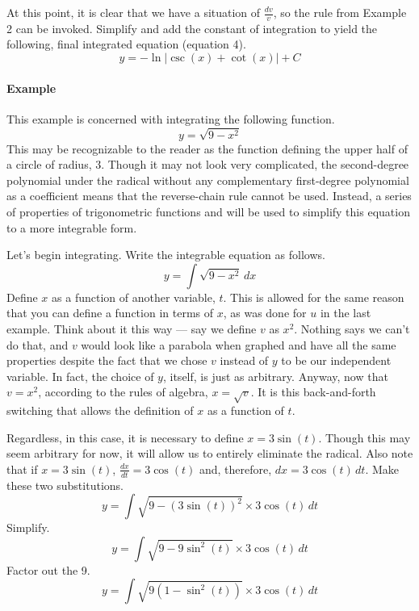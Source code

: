 \documentclass{article}
\newcounter{example}%
\newcommand{\ex}{\stepcounter{example} \paragraph{Example \theexample}}
\begin{document}
At this point, it is clear that we have a situation of $\frac{dv}{v}$, so the rule from Example 2 can be invoked. Simplify and add the constant of integration to yield the following, final integrated equation (equation 4).
\begin{equation}
    y=-\ln|\csc(x)+\cot(x)|+C
\end{equation}
\ex This example is concerned with integrating the following function.$$y=\sqrt{9-x^2}$$This may be recognizable to the reader as the function defining the upper half of a circle of radius, 3. Though it may not look very complicated, the second-degree polynomial under the radical without any complementary first-degree polynomial as a coefficient means that the reverse-chain rule cannot be used. Instead, a series of properties of trigonometric functions and will be used to simplify this equation to a more integrable form.\par
Let's begin integrating. Write the integrable equation as follows.
\begin{equation*}
    y=\int \sqrt{9-x^2}\, dx
\end{equation*}
Define $x$ as a function of another variable, $t$. This is allowed for the same reason that you can define a function in terms of $x$, as was done for $u$ in the last example. Think about it this way --- say we define $v$ as $x^2$. Nothing says we can't do that, and $v$ would look like a parabola when graphed and have all the same properties despite the fact that we chose $v$ instead of $y$ to be our independent variable. In fact, the choice of $y$, itself, is just as arbitrary. Anyway, now that $v=x^2$, according to the rules of algebra, $x=\sqrt{v}$. It is this back-and-forth switching that allows the definition of $x$ as a function of $t$.\par
Regardless, in this case, it is necessary to define $x=3\sin(t)$. Though this may seem arbitrary for now, it will allow us to entirely eliminate the radical. Also note that if $x=3\sin(t)$, $\frac{dx}{dt}=3\cos(t)$ and, therefore, $dx=3\cos(t)\, dt$. Make these two substitutions.
\begin{equation*}
    y=\int \sqrt{9-(3\sin(t))^2} \times 3\cos(t)\, dt
\end{equation*}
Simplify.
\begin{equation*}
    y=\int \sqrt{9-9\sin^2(t)} \times 3\cos(t)\, dt
\end{equation*}
Factor out the 9.
\begin{equation*}
    y=\int \sqrt{9(1-\sin^2(t))} \times 3\cos(t)\, dt
\end{equation*}
\end{document}
